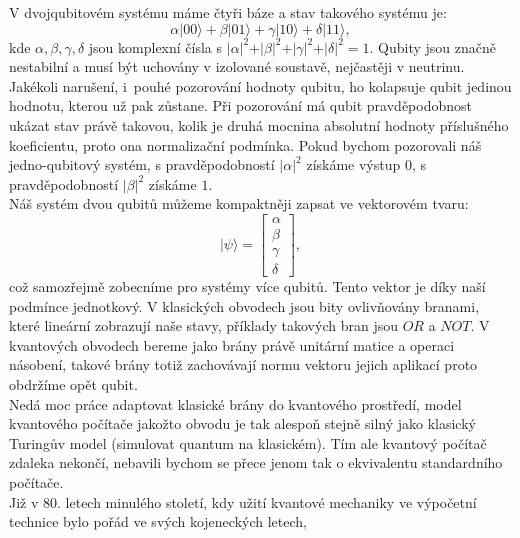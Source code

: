 \documentclass [12pt]{report}
\begin{document}
V dvojqubitovém systému máme čtyři báze a stav takového systému je:
\begin{equation*}
\alpha \vert 00 \rangle + \beta \vert 01 \rangle + \gamma \vert 10 \rangle + \delta \vert 11 \rangle, 
\end{equation*}
kde $\alpha,\beta,\gamma,\delta$ jsou komplexní čísla s $\vert \alpha \vert ^2 + \vert \beta \vert^2 + \vert \gamma \vert^2 + \vert \delta \vert^2 = 1$. Qubity jsou značně nestabilní a musí být uchovány v izolované soustavě, nejčastěji v neutrinu. Jakékoli narušení, i~pouhé pozorování hodnoty qubitu, ho kolapsuje qubit jedinou hodnotu, kterou už pak zůstane. Při pozorování má qubit pravděpodobnost ukázat stav právě takovou, kolik je druhá mocnina absolutní hodnoty příslušného koeficientu, proto ona normalizační podmínka. Pokud bychom pozorovali náš jedno-qubitový systém, s pravděpodobností $\vert \alpha \vert ^2$ získáme výstup $0$, s pravděpodobností $\vert \beta \vert ^2$ získáme $1$.\\

Náš systém dvou qubitů můžeme kompaktněji zapsat ve vektorovém tvaru:
\begin{equation*}
\vert \psi \rangle = \begin{bmatrix}
\alpha \\
\beta \\
\gamma \\
\delta
\end{bmatrix},
\end{equation*}
což samozřejmě zobecníme pro systémy více qubitů. Tento vektor je díky naší podmínce jednotkový. V klasických obvodech jsou bity ovlivňovány branami, které lineární zobrazují naše stavy, příklady takových bran jsou $OR$ a $NOT$. V kvantových obvodech bereme jako brány právě unitární matice a operaci násobení, takové brány totiž zachovávají normu vektoru  jejich aplikací proto obdržíme opět qubit.\\

Nedá moc práce adaptovat klasické brány do kvantového prostředí, model kvantového počítače jakožto obvodu je tak alespoň stejně silný jako klasický Turingův model (simulovat quantum na klasickém). Tím ale kvantový počítač zdaleka nekončí, nebavili bychom se přece jenom tak o ekvivalentu standardního počítače.\\

Již v 80. letech minulého století, kdy užití kvantové mechaniky ve výpočetní technice bylo pořád ve svých kojeneckých letech,  
\end{document}
